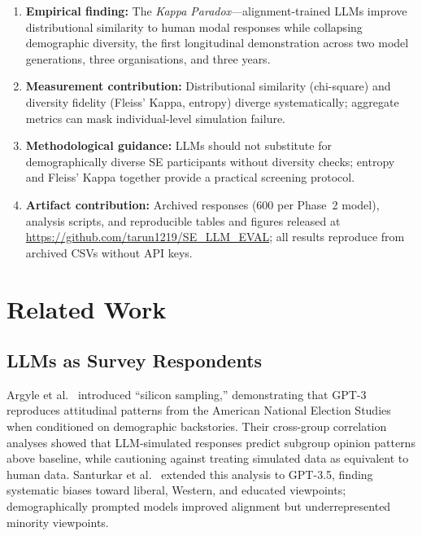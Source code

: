 \documentclass[12pt,a4paper]{article}
\newcommand{\kp}{\textit{Kappa Paradox}\xspace}
\begin{document}
\begin{enumerate}[leftmargin=1.5em,itemsep=2pt]
\item \textbf{Empirical finding:} The \kp---alignment-trained LLMs
  improve distributional similarity to human modal responses while
  collapsing demographic diversity, the first longitudinal demonstration
  across two model generations, three organisations, and three years.
\item \textbf{Measurement contribution:} Distributional similarity
  (chi-square) and diversity fidelity (Fleiss' Kappa, entropy) diverge
  systematically; aggregate metrics can mask individual-level simulation
  failure.
\item \textbf{Methodological guidance:} LLMs should not substitute for
  demographically diverse SE participants without diversity checks;
  entropy and Fleiss' Kappa together provide a practical screening
  protocol.
\item \textbf{Artifact contribution:} Archived responses (600 per
  Phase~2 model), analysis scripts, and reproducible tables and figures
  released at \url{https://github.com/tarun1219/SE_LLM_EVAL}; all
  results reproduce from archived CSVs without API keys.
\end{enumerate}

\section{Related Work}
\label{sec:related}

\subsection{LLMs as Survey Respondents}
\label{sec:rw:survey}

Argyle et al.~\cite{argyle2023} introduced ``silicon sampling,''
demonstrating that GPT-3 reproduces attitudinal patterns from the
American National Election Studies when conditioned on demographic
backstories.
Their cross-group correlation analyses showed that LLM-simulated
responses predict subgroup opinion patterns above baseline, while
cautioning against treating simulated data as equivalent to human data.
Santurkar et al.~\cite{santurkar2023} extended this analysis to
GPT-3.5, finding systematic biases toward liberal, Western, and educated
viewpoints; demographically prompted models improved alignment but
underrepresented minority viewpoints.
\end{document}
